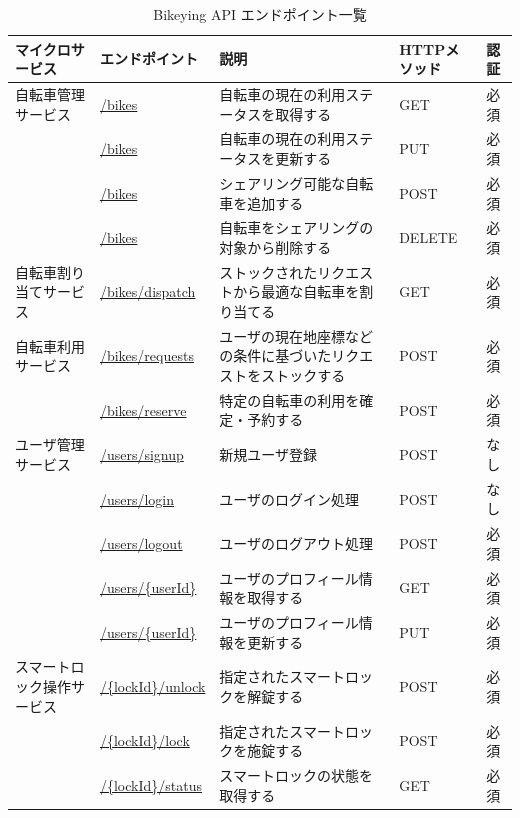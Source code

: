           \begin{table}[t]
            \caption{Bikeying API エンドポイント一覧}
            \label{tab:Bikeying API エンドポイント一覧}
            \centering
            \begin{tabular}{|p{3.5cm}|l|p{5cm}|l|l|} \hline
              マイクロサービス & エンドポイント & 説明 & HTTPメソッド & 認証 \\ \hline
              自転車管理サービス & \url{/bikes} & 自転車の現在の利用ステータスを取得する & GET & 必須 \\ \cline{2-5}
              & \url{/bikes} & 自転車の現在の利用ステータスを更新する & PUT & 必須 \\ \cline{2-5}
              & \url{/bikes} & シェアリング可能な自転車を追加する & POST & 必須 \\ \cline{2-5}
              & \url{/bikes} & 自転車をシェアリングの対象から削除する & DELETE & 必須 \\ \hline
              自転車割り当てサービス & \url{/bikes/dispatch} & ストックされたリクエストから最適な自転車を割り当てる & GET & 必須 \\ \hline
              自転車利用サービス & \url{/bikes/requests} & ユーザの現在地座標などの条件に基づいたリクエストをストックする & POST & 必須 \\ \cline{2-5}
              & \url{/bikes/reserve} & 特定の自転車の利用を確定・予約する & POST & 必須 \\ \hline
              ユーザ管理サービス & \url{/users/signup} & 新規ユーザ登録 & POST & なし \\ \cline{2-5}
              & \url{/users/login} & ユーザのログイン処理 & POST & なし \\ \cline{2-5}
              & \url{/users/logout} & ユーザのログアウト処理 & POST & 必須 \\ \cline{2-5}
              & \url{/users/{userId}} & ユーザのプロフィール情報を取得する & GET & 必須 \\ \cline{2-5}
              & \url{/users/{userId}} & ユーザのプロフィール情報を更新する & PUT & 必須 \\ \hline
              スマートロック操作サービス & \url{/{lockId}/unlock} & 指定されたスマートロックを解錠する & POST & 必須 \\ \cline{2-5}
              & \url{/{lockId}/lock} & 指定されたスマートロックを施錠する & POST & 必須 \\ \cline{2-5}
              & \url{/{lockId}/status} & スマートロックの状態を取得する & GET & 必須 \\ \hline
            \end{tabular}
          \end{table}

